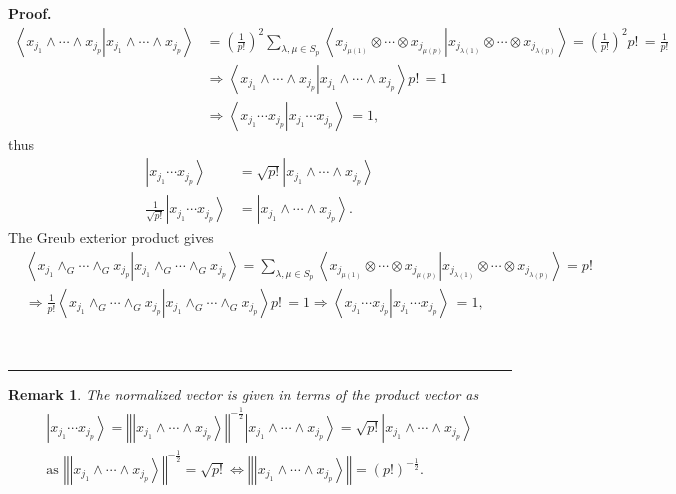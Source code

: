 \documentclass[aps,preprint]{revtex4}%
\newtheorem{remark}[theorem]{Remark}
\newenvironment{proof}[1][Proof]{\noindent\textbf{#1.} }{\ \rule{0.5em}{0.5em}}
\begin{document}
\begin{proof}%
\begin{align}
\left\langle \left.  x_{j_{1}}\wedge\cdots\wedge x_{j_{p}}\right\vert
x_{j_{1}}\wedge\cdots\wedge x_{j_{p}}\right\rangle  &  =\left(  \frac{1}%
{p!}\right)  ^{2}\sum_{\lambda,\mu\in S_{p}}\left\langle \left.
x_{j_{\mu\left(  1\right)  }}\otimes\cdots\otimes x_{j_{\mu\left(  p\right)
}}\right\vert x_{j_{\lambda\left(  1\right)  }}\otimes\cdots\otimes
x_{j_{\lambda\left(  p\right)  }}\right\rangle =\left(  \frac{1}{p!}\right)
^{2}p!\,=\frac{1}{p!}\\
&  \Rightarrow\left\langle \left.  x_{j_{1}}\wedge\cdots\wedge x_{j_{p}%
}\right\vert x_{j_{1}}\wedge\cdots\wedge x_{j_{p}}\right\rangle p!\,=1\\
&  \Rightarrow\left\langle \left.  x_{j_{1}}\cdots x_{j_{p}}\right\vert
x_{j_{1}}\cdots x_{j_{p}}\right\rangle \,=1,
\end{align}
thus
\begin{align}
\left\vert x_{j_{1}}\cdots x_{j_{p}}\right\rangle  &  =\sqrt{p!}\left\vert
x_{j_{1}}\wedge\cdots\wedge x_{j_{p}}\right\rangle \\
\frac{1}{\sqrt{p!}}\left\vert x_{j_{1}}\cdots x_{j_{p}}\right\rangle  &
=\left\vert x_{j_{1}}\wedge\cdots\wedge x_{j_{p}}\right\rangle .
\end{align}
The Greub exterior product gives
\begin{align}
&  \left\langle \left.  x_{j_{1}}\wedge_{G}\cdots\wedge_{G}x_{j_{p}%
}\right\vert x_{j_{1}}\wedge_{G}\cdots\wedge_{G}x_{j_{p}}\right\rangle
=\sum_{\lambda,\mu\in S_{p}}\left\langle \left.  x_{j_{\mu\left(  1\right)  }%
}\otimes\cdots\otimes x_{j_{\mu\left(  p\right)  }}\right\vert x_{j_{\lambda
\left(  1\right)  }}\otimes\cdots\otimes x_{j_{\lambda\left(  p\right)  }%
}\right\rangle =p!\,\\
&  \Rightarrow\frac{1}{p!}\left\langle \left.  x_{j_{1}}\wedge_{G}\cdots
\wedge_{G}x_{j_{p}}\right\vert x_{j_{1}}\wedge_{G}\cdots\wedge_{G}x_{j_{p}%
}\right\rangle p!\,=1\Rightarrow\left\langle \left.  x_{j_{1}}\cdots x_{j_{p}%
}\right\vert x_{j_{1}}\cdots x_{j_{p}}\right\rangle \,=1,
\end{align}

\end{proof}

\begin{remark}
The normalized vector is given in terms of the product vector as
\begin{gather}
\left\vert x_{j_{1}}\cdots x_{j_{p}}\right\rangle =\left\Vert \left\vert
x_{j_{1}}\wedge\cdots\wedge x_{j_{p}}\right\rangle \right\Vert ^{-\frac{1}{2}%
}\left\vert x_{j_{1}}\wedge\cdots\wedge x_{j_{p}}\right\rangle =\sqrt
{p!}\left\vert x_{j_{1}}\wedge\cdots\wedge x_{j_{p}}\right\rangle \\
\text{as }\left\Vert \left\vert x_{j_{1}}\wedge\cdots\wedge x_{j_{p}%
}\right\rangle \right\Vert ^{-\frac{1}{2}}=\sqrt{p!}\Leftrightarrow\left\Vert
\left\vert x_{j_{1}}\wedge\cdots\wedge x_{j_{p}}\right\rangle \right\Vert
=\left(  p!\right)  ^{-\frac{1}{2}}.
\end{gather}

\end{remark}
\end{document}
